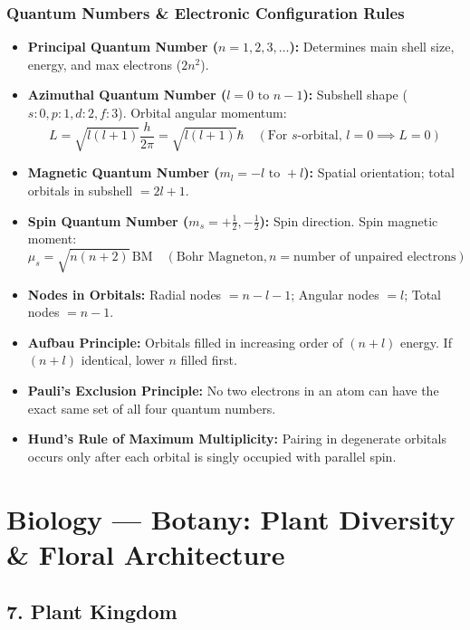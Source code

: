 \documentclass[11pt,a4paper]{article}
\begin{document}
\subsubsection{Quantum Numbers \& Electronic Configuration Rules}
\begin{itemize}[leftmargin=1.5em, itemsep=2pt]
  \item \textbf{Principal Quantum Number ($n = 1, 2, 3, \dots$):} Determines main shell size, energy, and max electrons ($2n^2$).
  \item \textbf{Azimuthal Quantum Number ($l = 0 \text{ to } n-1$):} Subshell shape ($s:0, p:1, d:2, f:3$). Orbital angular momentum:
  \[
    L = \sqrt{l(l+1)} \frac{h}{2\pi} = \sqrt{l(l+1)} \hbar \quad (\text{For $s$-orbital, } l = 0 \implies L = 0)
  \]
  \item \textbf{Magnetic Quantum Number ($m_l = -l \text{ to } +l$):} Spatial orientation; total orbitals in subshell $= 2l + 1$.
  \item \textbf{Spin Quantum Number ($m_s = +\frac{1}{2}, -\frac{1}{2}$):} Spin direction. Spin magnetic moment:
  \[
    \mu_s = \sqrt{n(n+2)} \, \text{BM} \quad (\text{Bohr Magneton}, n = \text{number of unpaired electrons})
  \]
  \item \textbf{Nodes in Orbitals:}
  Radial nodes $= n - l - 1$; Angular nodes $= l$; Total nodes $= n - 1$.
  \item \textbf{Aufbau Principle:} Orbitals filled in increasing order of $(n + l)$ energy. If $(n + l)$ identical, lower $n$ filled first.
  \item \textbf{Pauli's Exclusion Principle:} No two electrons in an atom can have the exact same set of all four quantum numbers.
  \item \textbf{Hund's Rule of Maximum Multiplicity:} Pairing in degenerate orbitals occurs only after each orbital is singly occupied with parallel spin.
\end{itemize}

\vspace{10pt}

\section{Biology --- Botany: Plant Diversity \& Floral Architecture}

\subsection{7. Plant Kingdom}
\end{document}
